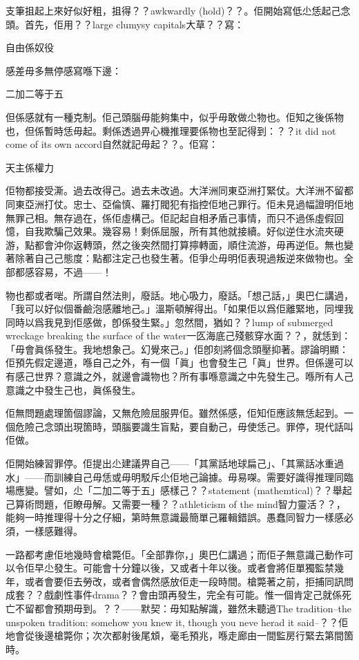 支筆抯起上來好似好粗，抯得？？awkwardly (hold)？？。佢開始寫低尐恁起己念頭。首先，佢用？？large clumysy capitals大草？？寫：

自由係奴役

感差毋多無停感寫喺下邊：

二加二等于五

但係感就有一種克制。佢己頭腦毋能夠集中，似乎毋敢做尐物也。佢知之後係物也，但係暫時恁毋起。剩係透過畀心機推理要係物也至記得到：？？it did not come of its own accord自然就記毋起？？。佢寫：

天主係權力

佢物都接受澌。過去改得己。過去未改過。大洋洲同東亞洲打緊仗。大洋洲不留都同東亞洲打仗。忠士、亞倫慎、羅打閥犯有指控佢地己罪行。佢未見過幅證明佢地無罪己相。無存過在，係佢虛構己。佢記起自相矛盾己事情，而只不過係虛假回憶，自我欺騙己效果。幾容易！剩係屈服，所有其他就接續。好似逆住水流夾硬游，點都會沖你返轉頭，然之後突然間打算擰轉面，順住流游，毋再逆佢。無也變著除著自己己態度：點都注定己也發生著。佢爭尐毋明佢表現過叛逆來做物也。全部都感容易，不過——！

物也都或者啱。所謂自然法則，廢話。地心吸力，廢話。「想己話，」奧巴仁講過，「我可以好似個番鹼泡感離地己。」溫斯頓解得出。「如果佢以爲佢離緊地，同埋我同時以爲我見到佢感做，卽係發生緊。」忽然間，猶如？？lump of submerged wreckage breaking the surface of the water一匛海底己殘骸穿水面？？，就恁到：「毋會眞係發生。我地想象己。幻覺來己。」佢卽刻將個念頭壓抑著。謬論明顯：佢預先假定邊道，喺自己之外，有一個「眞」也會發生己「眞」世界。但係邊可以有感己世界？意識之外，就邊會識物也？所有事喺意識之中先發生己。喺所有人己意識之中發生己也，眞係發生。

佢無問題處理箇個謬論，又無危險屈服畀佢。雖然係感，佢知佢應該無恁起到。一個危險己念頭出現箇時，頭腦要識生盲點，要自動己，毋使恁己。罪停，現代話叫佢做。

佢開始練習罪停。佢提出尐建議畀自己——「其黨話地球扁己」、「其黨話冰重過水」——而訓練自己毋恁或毋明駁斥尐佢地己論據。毋易㗎。需要好識得推理同臨場應變。譬如，尐「二加二等于五」感樣己？？statement (mathemtical)？？舉起己算術問題，佢瞭毋解。又需要一種？？athleticism of the mind智力靈活？？，能夠一時推理得十分之仔細，第時無意識最簡單己羅輯錯誤。愚蠢同智力一樣感必須，一樣感難得。

一路都考慮佢地幾時會槍斃佢。「全部靠你，」奧巴仁講過；而佢子無意識己動作可以令佢早尐發生。可能會十分鐘以後，又或者十年以後。或者會將佢單獨監禁幾年，或者會要佢去勞改，或者會偶然感放佢走一段時間。槍斃著之前，拒捕同訊問成套？？戲劇性事件drama？？會由頭再發生，完全有可能。惟一個肯定己就係死亡不留都會預期毋到。？？——默契：毋知點解識，雖然未聽過The tradition--the unspoken tradition: somehow you knew it, though you neve herad it said--？？佢地會從後邊槍斃你；次次都射後尾䪴，毫毛預兆，喺走廊由一間監房行緊去第間箇時。

